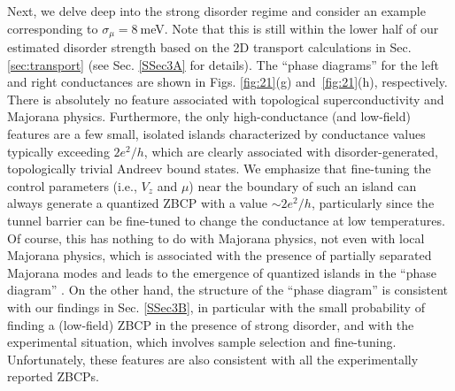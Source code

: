 \documentclass[aps,prmaterials,twocolumn,superscriptaddress,longbibliography]{revtex4-2}
\begin{document}
Next, we delve deep into the strong disorder regime and consider an example corresponding to $\sigma_\mu=8~$meV. Note that this is still within the lower half of our estimated disorder strength based on the 2D transport calculations in Sec. \ref{sec:transport} (see Sec. \ref{SSec3A} for details). The ``phase diagrams'' for the left and right conductances are shown in Figs. \ref{fig:21}(g) and~\ref{fig:21}(h), respectively. There is absolutely no feature associated with topological superconductivity and Majorana physics. Furthermore, the only high-conductance (and low-field) features are a few small, isolated islands characterized by conductance values typically exceeding $2e^2/h$, which are clearly associated with disorder-generated, topologically trivial Andreev bound states. We emphasize that fine-tuning the control parameters (i.e., $V_z$ and $\mu$) near the boundary of such an island can always generate a quantized ZBCP with a value $\sim 2e^2/h$, particularly since the tunnel barrier can be fine-tuned to change the conductance at low temperatures. Of course, this has nothing to do with Majorana physics, not even with local Majorana physics, which is associated with the presence of partially separated Majorana modes and leads to the emergence of quantized islands in the ``phase diagram'' \cite{zeng2021partiallyseparated}. On the other hand, the structure of the ``phase diagram'' is consistent with our findings in Sec. \ref{SSec3B}, in particular with the small probability of finding a (low-field) ZBCP in the presence of strong disorder, and with the experimental situation, which involves sample selection and fine-tuning. Unfortunately, these features are also consistent with all the experimentally reported ZBCPs.
\end{document}
